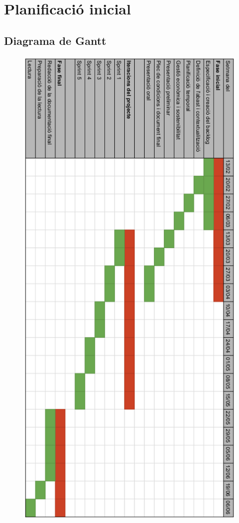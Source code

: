 
\chapter{Planificació inicial} %

\label{AppendixB} %

\section{Diagrama de Gantt}
\label{Gantt}

\begin{figure}[H]
\centering
\includegraphics[scale=0.5]{Figures/gantt.png}
\end{figure}
